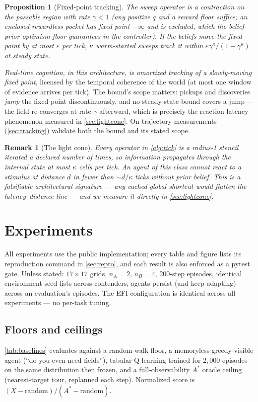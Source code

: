 \documentclass[11pt]{article}
\newtheorem{proposition}{Proposition}
\newtheorem{remark}{Remark}
\begin{document}
\begin{proposition}[Fixed-point tracking]
\label{prop:tracking}
The sweep operator is a contraction on the passable region with rate $\gamma<1$ (any positive $q$ and a reward floor suffice; an enclosed rewardless pocket has fixed point $-\infty$ and is excluded, which the belief-prior optimism floor guarantees in the controller). If the beliefs move the fixed point by at most $\varepsilon$ per tick, $\kappa$ warm-started sweeps track it within $\varepsilon\gamma^{\kappa}/(1-\gamma^{\kappa})$ at steady state.
\end{proposition}
\noindent \emph{Real-time cognition, in this architecture, is amortized tracking of a slowly-moving fixed point}, licensed by the temporal coherence of the world (at most one window of evidence arrives per tick). The bound's scope matters: pickups and discoveries \emph{jump} the fixed point discontinuously, and no steady-state bound covers a jump --- the field re-converges at rate $\gamma$ afterward, which is precisely the reaction-latency phenomenon measured in \cref{sec:lightcone}. On-trajectory measurements (\cref{sec:tracking}) validate both the bound and its stated scope.

\begin{remark}[The light cone]
Every operator in \cref{alg:tick} is a radius-1 stencil iterated a declared number of times, so information propagates through the internal state at most $\kappa$ cells per tick. An agent of this class cannot react to a stimulus at distance $d$ in fewer than ${\sim}d/\kappa$ ticks without prior belief. This is a falsifiable architectural signature --- any cached global shortcut would flatten the latency--distance line --- and we measure it directly in \cref{sec:lightcone}.
\end{remark}

\section{Experiments}
\label{sec:experiments}
All experiments use the public implementation; every table and figure lists its reproduction command in \cref{sec:repro}, and each result is also enforced as a pytest gate. Unless stated: $17{\times}17$ grids, $n_A{=}2$, $n_B{=}4$, 200-step episodes, identical environment seed lists across contenders, agents persist (and keep adapting) across an evaluation's episodes. The EFI configuration is identical across all experiments --- no per-task tuning.

\subsection{Floors and ceilings}
\label{sec:baselines}
\cref{tab:baselines} evaluates against a random-walk floor, a memoryless greedy-visible agent (``do you even need fields''), tabular Q-learning trained for $2{,}000$ episodes on the same distribution then frozen, and a full-observability $A^\ast$ oracle ceiling (nearest-target tour, replanned each step). Normalized score is $(X-\text{random})/(A^\ast-\text{random})$.
\end{document}
